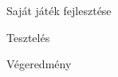 \begin{MyChapter}{Saját játék fejlesztése}
	\begin{MySection}{Tesztelés}
	\end{MySection}

	\begin{MySection}{Végeredmény}
	\end{MySection}

\end{MyChapter}